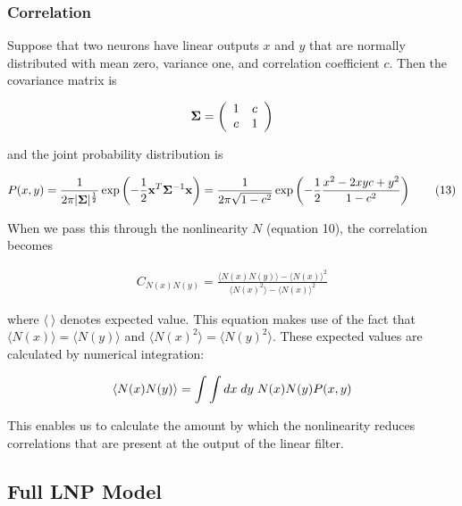 \documentclass[12pt]{article}
\begin{document}
\subsubsection{Correlation}

Suppose that two neurons have linear outputs $x$ and $y$ that are normally distributed with mean zero, variance one, and correlation coefficient $c$. Then the covariance matrix is

\[ {\bf\Sigma} = \left( \begin{array}{cc}
1 & c \\
c & 1 \\
\end{array} \right) \]

\noindent and the joint probability distribution is

\begin{align}
\displaystyle P(x,y) = \frac{1}{2\pi |{\bf \Sigma}|^{\frac{1}{2}}}\exp\left( -\frac{1}{2}{\bf x}^T {\bf \Sigma}^{-1} {\bf x}\right)=\frac{1}{2\pi \sqrt{1-c^2}}\exp\left( -\frac{1}{2}\frac{x^2-2xyc+y^2}{1-c^2}\right) \tag{13}
\end{align}

\noindent When we pass this through the nonlinearity $N$ (equation 10), the correlation becomes

\begin{align}
\displaystyle C_{N(x)N(y)} = \frac{\langle N(x)N(y)\rangle- \langle N(x)\rangle^2}{\langle N(x)^2 \rangle - \langle N(x) \rangle^2} \tag{12}
\end{align}

\noindent where $\langle \:\rangle$ denotes expected value. This equation makes use of the fact that $\langle N(x) \rangle = \langle N(y) \rangle$ and $\langle N(x)^2 \rangle = \langle N(y)^2 \rangle$. These expected values are calculated by numerical integration:

\begin{align}
\langle N(x)N(y) \rangle = \int \int dx\;dy\;N(x)N(y)P(x,y) \notag
\end{align}

\noindent This enables us to calculate the amount by which the nonlinearity reduces correlations that are present at the output of the linear filter.

\subsection{Full LNP Model}
\end{document}
